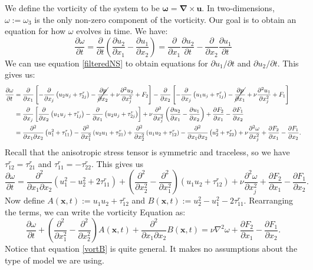 \documentclass[11pt,a4paper]{article}
\begin{document}
We define the vorticity of the system to be $\boldsymbol{\omega} = \boldsymbol{\nabla}\times\boldsymbol{u}$. In two-dimensions, $\omega:= \omega_3$ is the only non-zero component of the vorticity. Our goal is to obtain an equation for how $\omega$ evolves in time. We have:
$$\frac{\partial \omega}{\partial t}   =  \frac{\partial }{\partial t}\left(\frac{\partial u_2}{\partial x_1} -\frac{\partial u_1}{\partial x_2} \right)=  \frac{\partial }{\partial x_1}\frac{\partial u_2}{\partial t} -\frac{\partial }{\partial x_2}\frac{\partial u_1}{\partial t}$$
We can use equation \ref{filteredNS} to obtain equations for ${\partial u_1}/{\partial t}$ and ${\partial u_2}/{\partial t}$. This gives us:
\begin{align*}
\frac{\partial \omega}{\partial t} &= \frac{\partial }{\partial x_1}\left[- \frac{\partial }{\partial x_j}\left({u}_2{u}_j +\tau_{2j}^r\right)-\cancel{\frac{\partial {p}}{\partial x_2}}+  \nu \frac{\partial^2u_2}{\partial x_j^2}+ {F}_2\right]-\frac{\partial }{\partial x_2}\left[- \frac{\partial }{\partial x_j}\left({u}_1{u}_j +\tau_{1j}^r\right)-\cancel{\frac{\partial {p}}{\partial x_1}}+ \nu \frac{\partial^2u_1}{\partial x_j^2}+ {F}_1\right]\\
&= \frac{\partial }{\partial x_j}\left[ \frac{\partial }{\partial x_2}\left({u}_1{u}_j +\tau_{1j}^r\right) - \frac{\partial }{\partial x_1}\left({u}_2{u}_j +\tau_{2j}^r\right)\right] +\nu \frac{\partial^2}{\partial x_j^2}\left(\frac{\partial u_2}{\partial x_1} -\frac{\partial u_1}{\partial x_2}\right) +\frac{\partial F_2}{\partial x_1} -\frac{\partial F_1}{\partial x_2}\\
&= \frac{\partial^2 }{\partial x_1\partial x_2}\left({u}_1^2 +\tau_{11}^r\right) - \frac{\partial^2 }{\partial x_1^2}\left({u}_2{u}_1 +\tau_{21}^r\right)+\frac{\partial^2 }{\partial x_2^2}\left({u}_1{u}_2 +\tau_{12}^r\right) - \frac{\partial^2 }{\partial x_1\partial x_2}\left({u}_2^2+\tau_{22}^r\right) +\nu \frac{\partial^2\omega}{\partial x_j^2}+\frac{\partial F_2}{\partial x_1} -\frac{\partial F_1}{\partial x_2}.
\end{align*}
Recall that the anisotropic stress tensor is symmetric and traceless, so we have $\tau_{12}^r=\tau_{21}^r$ and $\tau_{11}^r = -\tau_{22}^r$. This gives us
$$\frac{\partial \omega}{\partial t} = \frac{\partial^2 }{\partial x_1\partial x_2}\left({u}_1^2 -{u}_2^2+2\tau_{11}^r\right) +\left(\frac{\partial^2 }{\partial x_2^2} - \frac{\partial^2 }{\partial x_1^2}\right)\left({u}_1{u}_2 +\tau_{12}^r\right) +\nu \frac{\partial^2\omega}{\partial x_j^2}+\frac{\partial F_2}{\partial x_1} -\frac{\partial F_1}{\partial x_2}.$$
Now define $A(\boldsymbol{x}, t) :=u_1u_2 + \tau_{12}^r$ and $B(\boldsymbol{x}, t)  := u_2^2-u_1^2- 2\tau_{11}^r$. Rearranging the terms, we can write the vorticity Equation as:
\begin{equation}\label{vortB}
\frac{\partial \omega}{\partial t}  + \left(\frac{\partial^2}{\partial x_1^2} - \frac{\partial^2}{\partial x_2^2}\right)A(\boldsymbol{x}, t) + \frac{\partial^2 }{\partial x_1\partial x_2}B(\boldsymbol{x}, t) = \nu{\nabla}^2\omega+\frac{\partial F_2}{\partial x_1} - \frac{\partial F_1}{\partial x_2} .
\end{equation}
Notice that equation \ref{vortB} is quite general. It makes no assumptions about the type of model we are using. 
\end{document}

